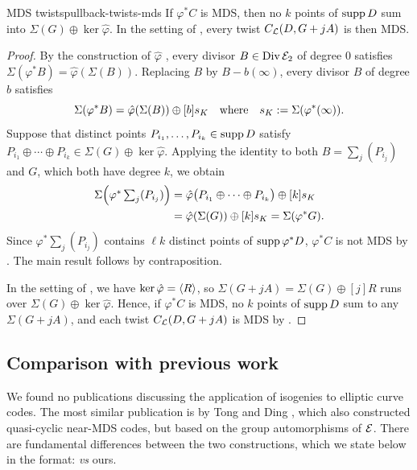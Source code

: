 \documentclass[twocolumn, 11pt]{scrartcl}
\begin{document}
\begin{corollary}{MDS twists}{pullback-twists-mds}
    If $\varphi^*C$ is MDS, then no $k$ points of $\operatorname{supp} D$ sum into $\Sigma(G)\oplus\ker\hat\varphi$. In the setting of , every twist $C_\mathcal{L}(D,G+jA)$ is then MDS.
\end{corollary}

\begin{proof}
    By the construction of $\hat\varphi$ \cite[Thm.~III.6.1(b)]{silverman2009arithmetic}, every divisor $B\in\operatorname{Div}\mathcal{E}_2$ of degree 0 satisfies $\Sigma(\varphi^*B)=\hat\varphi(\Sigma(B))$. Replacing $B$ by $B-b(\infty)$, every divisor $B$ of degree $b$ satisfies
    \[ \Sigma(\varphi^*B)=\hat\varphi(\Sigma(B))\oplus[b]s_K \quad\text{where}\quad s_K:=\Sigma(\varphi^*(\infty)). \]
    Suppose that distinct points $P_{i_1},\hdots,P_{i_k}\in\operatorname{supp} D$ satisfy $P_{i_1}\oplus\cdots\oplus P_{i_k}\in\Sigma(G)\oplus\ker\hat\varphi$. Applying the identity to both $B=\sum_j(P_{i_j})$ and $G$, which both have degree $k$, we obtain
    \begin{align*}
        \textstyle \Sigma\pa*{\varphi^*\sum_j(P_{i_j})}&=\hat\varphi\pa[\big]{P_{i_1}\oplus\cdots\oplus P_{i_k}}\oplus[k]s_K \\
        &=\hat\varphi(\Sigma(G))\oplus[k]s_K=\Sigma(\varphi^*G).
    \end{align*}
    Since $\varphi^*\sum_j(P_{i_j})$ contains $\ell k$ distinct points of $\operatorname{supp}\varphi^*D$, $\varphi^*C$ is not MDS by . The main result follows by contraposition.
    
    In the setting of , we have $\ker\hat\varphi=\langle R\rangle$, so $\Sigma(G+jA)=\Sigma(G)\oplus[j]R$ runs over $\Sigma(G)\oplus\ker\hat\varphi$. Hence, if $\varphi^*C$ is MDS, no $k$ points of $\operatorname{supp} D$ sum to any $\Sigma(G+jA)$, and each twist $C_\mathcal{L}(D,G+jA)$ is MDS by .
\end{proof}

\subsection{Comparison with previous work}

We found no publications discussing the application of isogenies to elliptic curve codes. The most similar publication is by Tong and Ding \cite{tong2013quasicyclic}, which also constructed quasi-cyclic near-MDS codes, but based on the group automorphisms of $\mathcal{E}$. There are fundamental differences between the two constructions, which we state below in the format: \cite{tong2013quasicyclic} \textit{vs} ours.
\end{document}
